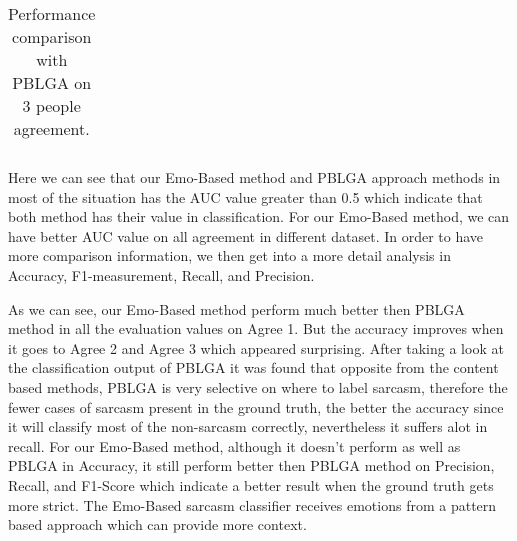 \documentclass[12pt,a4paper]{report}
\theoremstyle{definition}
\begin{document}
\begin{CJK}{UTF8}{bsmi}
\begin{table}[H]
\begin{tabular}{l | l | l | l | l | l | l}
                \hline
            \end{tabular}
            \caption{Performance comparison with PBLGA on 3 people agreement.}
            \label{tab:pblga_agree3}
        \end{table}
            
        \par Here we can see that our Emo-Based method and PBLGA approach methods in most of the situation has the AUC value greater than 0.5 which indicate that both method has their value in classification.
        For our Emo-Based method, we can have better AUC value on all agreement in different dataset.
        In order to have more  comparison information, we then get into a more detail analysis in Accuracy, F1-measurement, Recall, and Precision.
        \par As we can see, our Emo-Based method perform much better then PBLGA method in all the evaluation values on Agree 1. But the accuracy improves when it goes to Agree 2 and Agree 3 which appeared surprising. After taking a look at the classification output of PBLGA it was found that opposite from the content based methods, PBLGA is very selective on where to label sarcasm, therefore the fewer cases of sarcasm present in the ground truth, the better the accuracy since it will classify most of the non-sarcasm correctly, nevertheless it suffers alot in recall. For our Emo-Based method, although it doesn't perform as well as PBLGA in Accuracy, it still perform better then PBLGA method on Precision, Recall, and F1-Score which indicate a better result when the ground truth gets more strict. The Emo-Based sarcasm classifier receives emotions from a pattern based approach which can provide more context.
        

\end{CJK}
\end{document}
